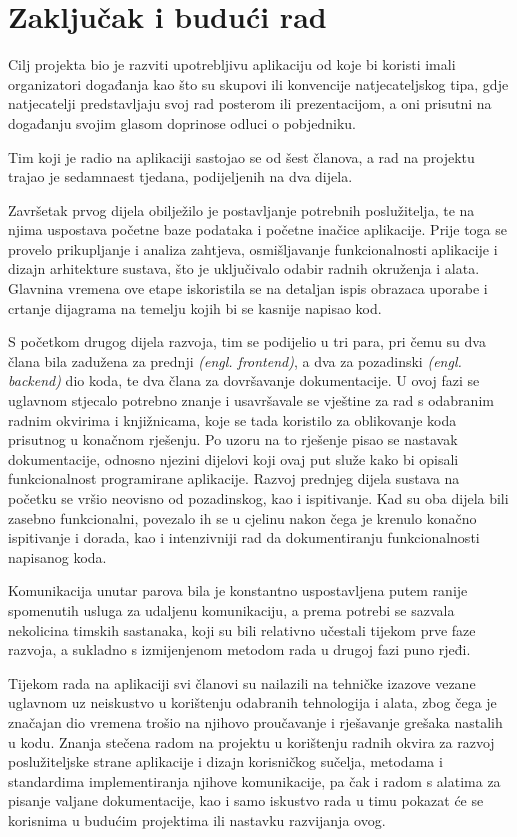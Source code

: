 \chapter{Zaključak i budući rad}
		 
		 Cilj projekta bio je razviti upotrebljivu aplikaciju od koje bi koristi imali organizatori događanja kao što su skupovi ili konvencije natjecateljskog tipa, gdje natjecatelji predstavljaju svoj rad posterom ili prezentacijom, a oni prisutni na događanju svojim glasom doprinose odluci o pobjedniku.
		 
		 Tim koji je radio na aplikaciji sastojao se od šest članova, a rad na projektu trajao je sedamnaest tjedana, podijeljenih na dva dijela.
		 
		 Završetak prvog dijela obilježilo je postavljanje potrebnih poslužitelja, te na njima uspostava početne baze podataka i početne inačice aplikacije. Prije toga se provelo prikupljanje i analiza zahtjeva, osmišljavanje funkcionalnosti aplikacije i dizajn arhitekture sustava, što je uključivalo odabir radnih okruženja i alata. Glavnina vremena ove etape iskoristila se na detaljan ispis obrazaca uporabe i crtanje dijagrama na temelju kojih bi se kasnije napisao kod.
		 
		 S početkom drugog dijela razvoja, tim se podijelio u tri para, pri čemu su dva člana bila zadužena za prednji \textit{(engl. frontend)}, a dva za pozadinski \textit{(engl. backend)} dio koda, te dva člana za dovršavanje dokumentacije. U ovoj fazi se uglavnom stjecalo potrebno znanje i usavršavale se vještine za rad s odabranim radnim okvirima i knjižnicama, koje se tada koristilo za oblikovanje koda prisutnog u konačnom rješenju. Po uzoru na to rješenje pisao se nastavak dokumentacije, odnosno njezini dijelovi koji ovaj put služe kako bi opisali funkcionalnost programirane aplikacije. Razvoj prednjeg dijela sustava na početku se vršio neovisno od pozadinskog, kao i ispitivanje. Kad su oba dijela bili zasebno funkcionalni, povezalo ih se u cjelinu nakon čega je krenulo konačno ispitivanje i dorada, kao i intenzivniji rad da dokumentiranju funkcionalnosti napisanog koda.
		 
		 Komunikacija unutar parova bila je konstantno uspostavljena putem ranije spomenutih usluga za udaljenu komunikaciju, a prema potrebi se sazvala nekolicina timskih sastanaka, koji su bili relativno učestali tijekom prve faze razvoja, a sukladno s izmijenjenom metodom rada u drugoj fazi puno rjeđi.
		 
		 Tijekom rada na aplikaciji svi članovi su nailazili na tehničke izazove vezane uglavnom uz neiskustvo u korištenju odabranih tehnologija i alata, zbog čega je značajan dio vremena trošio na njihovo proučavanje i rješavanje grešaka nastalih u kodu. Znanja stečena radom na projektu u korištenju radnih okvira za razvoj poslužiteljske strane aplikacije i dizajn korisničkog sučelja, metodama i standardima implementiranja njihove komunikacije, pa čak i radom s alatima za pisanje valjane dokumentacije, kao i samo iskustvo rada u timu pokazat će se korisnima u budućim projektima ili nastavku razvijanja ovog.
		 
